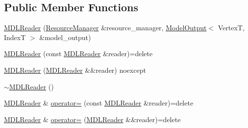 \subsection*{Public Member Functions}
\begin{DoxyCompactItemize}
\item 
\hyperlink{classmage_1_1rendering_1_1loader_1_1_m_d_l_reader_acc6d10b858b43608cb22d9086ae227fd}{M\+D\+L\+Reader} (\hyperlink{classmage_1_1rendering_1_1_resource_manager}{Resource\+Manager} \&resource\+\_\+manager, \hyperlink{structmage_1_1rendering_1_1_model_output}{Model\+Output}$<$ VertexT, IndexT $>$ \&model\+\_\+output)
\item 
\hyperlink{classmage_1_1rendering_1_1loader_1_1_m_d_l_reader_a98d83bb5d8cec2b8e665f08bc50068f6}{M\+D\+L\+Reader} (const \hyperlink{classmage_1_1rendering_1_1loader_1_1_m_d_l_reader}{M\+D\+L\+Reader} \&reader)=delete
\item 
\hyperlink{classmage_1_1rendering_1_1loader_1_1_m_d_l_reader_a77f5be43642636faf71e7fb3eed7e050}{M\+D\+L\+Reader} (\hyperlink{classmage_1_1rendering_1_1loader_1_1_m_d_l_reader}{M\+D\+L\+Reader} \&\&reader) noexcept
\item 
\hyperlink{classmage_1_1rendering_1_1loader_1_1_m_d_l_reader_a2f4c6bd8c2ef49180538ddfe5530e230}{$\sim$\+M\+D\+L\+Reader} ()
\item 
\hyperlink{classmage_1_1rendering_1_1loader_1_1_m_d_l_reader}{M\+D\+L\+Reader} \& \hyperlink{classmage_1_1rendering_1_1loader_1_1_m_d_l_reader_a76e89824650cdf1d737048ac06862166}{operator=} (const \hyperlink{classmage_1_1rendering_1_1loader_1_1_m_d_l_reader}{M\+D\+L\+Reader} \&reader)=delete
\item 
\hyperlink{classmage_1_1rendering_1_1loader_1_1_m_d_l_reader}{M\+D\+L\+Reader} \& \hyperlink{classmage_1_1rendering_1_1loader_1_1_m_d_l_reader_a2afa24fc79ecdcf15f0cbf09f7a78e52}{operator=} (\hyperlink{classmage_1_1rendering_1_1loader_1_1_m_d_l_reader}{M\+D\+L\+Reader} \&\&reader)=delete
\end{DoxyCompactItemize}
